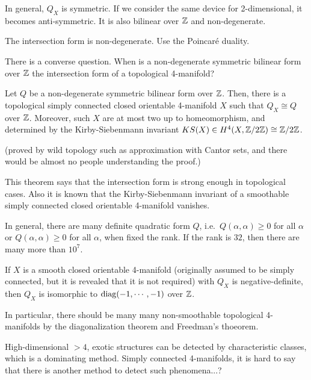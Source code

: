 \documentclass{../../../small}
\begin{document}
In general, $Q_X$ is symmetric.
If we consider the same device for 2-dimensional, it becomes anti-symmetric.
It is also bilinear over $\mathbb{Z}$ and non-degenerate.

\begin{exercise}
The intersection form is non-degenerate.
Use the Poincar\'e duality.
\end{exercise}

There is a converse question.
When is a non-degenerate symmetric bilinear form over $\mathbb{Z}$ the intersection form of a topological 4-manifold?

\begin{theorem}[Freedman, 1982]
Let $Q$ be a non-degenerate symmetric bilinear form over $\mathbb{Z}$.
Then, there is a topological simply connected closed orientable 4-manifold $X$ such that $Q_X\cong Q$ over $\mathbb{Z}$.
Moreover, such $X$ are at most two up to homeomorphism, and determined by the Kirby-Siebenmann invariant $KS(X)\in H^4(X,\mathbb{Z}/2\mathbb{Z})\cong\mathbb{Z}/2\mathbb{Z}$.
\end{theorem}

(proved by wild topology such as approximation with Cantor sets, and there would be almost no people understanding the proof.)

This theorem says that the intersection form is strong enough in topological cases.
Also it is known that the Kirby-Siebenmann invariant of a smoothable simply connected closed orientable 4-manifold vanishes.

In general, there are many definite quadratic form $Q$, i.e.~$Q(\alpha,\alpha)\ge0$ for all $\alpha$ or $Q(\alpha,\alpha)\ge0$ for all $\alpha$, when fixed the rank.
If the rank is $32$, then there are many more than $10^7$.


\begin{theorem}
If $X$ is a smooth closed orientable 4-manifold (originally assumed to be simply connected, but it is revealed that it is not required) with $Q_X$ is negative-definite, then $Q_X$ is isomorphic to $\operatorname{diag}(-1,\cdots,-1)$ over $\mathbb{Z}$.
\end{theorem}

In particular, there should be many many non-smoothable topological 4-manifolds by the diagonalization theorem and Freedman's thoeorem.


High-dimensional $>4$, exotic structures can be detected by characteristic classes, which is a dominating method.
Simply connected 4-manifolds, it is hard to say that there is another method to detect such phenomena...?
\end{document}
